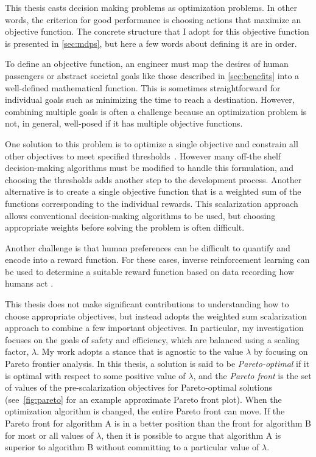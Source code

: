 
This thesis casts decision making problems as optimization problems.
In other words, the criterion for good performance is choosing actions that maximize an objective function.
The concrete structure that I adopt for this objective function is presented in \cref{sec:mdps}, but here a few words about defining it are in order.

To define an objective function, an engineer must map the desires of human passengers or abstract societal goals like those described in \cref{sec:benefits} into a well-defined mathematical function.
This is sometimes straightforward for individual goals such as minimizing the time to reach a destination.
However, combining multiple goals is often a challenge because an optimization problem is not, in general, well-posed if it has multiple objective functions.

One solution to this problem is to optimize a single objective and constrain all other objectives to meet specified thresholds~\cite{EA:99}.
However many off-the shelf decision-making algorithms must be modified to handle this formulation, and choosing the thresholds adds another step to the development process.
Another alternative is to create a single objective function that is a weighted sum of the functions corresponding to the individual rewards.
This scalarization approach allows conventional decision-making algorithms to be used, but choosing appropriate weights before solving the problem is often difficult.

Another challenge is that human preferences can be difficult to quantify and encode into a reward function.
For these cases, inverse reinforcement learning can be used to determine a suitable reward function based on data recording how humans act \cite{levine2012continuous, sadigh2016leverage}.

This thesis does not make significant contributions to understanding how to choose appropriate objectives, but instead adopts the weighted sum scalarization approach to combine a few important objectives.
In particular, my investigation focuses on the goals of safety and efficiency, which are balanced using a scaling factor, $\lambda$.
My work adopts a stance that is agnostic to the value $\lambda$ by focusing on Pareto frontier analysis.
In this thesis, a solution is said to be \emph{Pareto-optimal} if it is optimal with respect to some positive value of $\lambda$, and the \emph{Pareto front} is the set of values of the pre-scalarization objectives for Pareto-optimal solutions (see~\cref{fig:pareto} for an example approximate Pareto front plot).
When the optimization algorithm is changed, the entire Pareto front can move.
If the Pareto front for algorithm A is in a better position than the front for algorithm B for most or all values of $\lambda$, then it is possible to argue that algorithm A is superior to algorithm B without committing to a particular value of $\lambda$.

